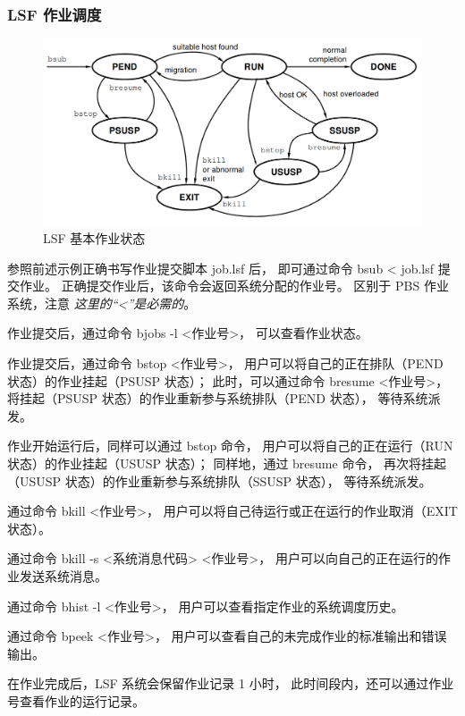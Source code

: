 \documentclass[UTF8]{ctexart}
\newcommand{\myem}[1]{{\color{red}\em #1}}
\newcommand{\mynnote}[1]{\colorbox{gray!15}{\color{blue!65}#1}}
\begin{document}
\subsubsection{LSF 作业调度}
\begin{figure}[h]
  \centering
  \includegraphics[width=140mm]{material/bjobstate.png}
  \caption{LSF 基本作业状态}
\end{figure}

参照前述示例正确书写作业提交脚本 job.lsf 后，
即可通过命令 \mynnote{bsub < job.lsf} 提交作业。
正确提交作业后，该命令会返回系统分配的作业号。
区别于 PBS 作业系统，注意 \myem{这里的“<”是必需的}。

作业提交后，通过命令 \mynnote{bjobs -l <作业号>}，
可以查看作业状态。

作业提交后，通过命令 \mynnote{bstop <作业号>}，
用户可以将自己的正在排队（PEND 状态）的作业挂起（PSUSP 状态）；
此时，可以通过命令 \mynnote{bresume <作业号>}，
将挂起（PSUSP 状态）的作业重新参与系统排队（PEND 状态），
等待系统派发。

作业开始运行后，同样可以通过 bstop 命令，
用户可以将自己的正在运行（RUN 状态）的作业挂起（USUSP 状态）；
同样地，通过 bresume 命令，
再次将挂起（USUSP 状态）的作业重新参与系统排队（SSUSP 状态），
等待系统派发。

通过命令 \mynnote{bkill <作业号>}，
用户可以将自己待运行或正在运行的作业取消（EXIT 状态）。

通过命令 \mynnote{bkill -s <系统消息代码> <作业号>}，
用户可以向自己的正在运行的作业发送系统消息。

通过命令 \mynnote{bhist -l <作业号>}，
用户可以查看指定作业的系统调度历史。

通过命令 \mynnote{bpeek <作业号>}，
用户可以查看自己的未完成作业的标准输出和错误输出。

在作业完成后，LSF 系统会保留作业记录 1 小时，
此时间段内，还可以通过作业号查看作业的运行记录。
\end{document}

